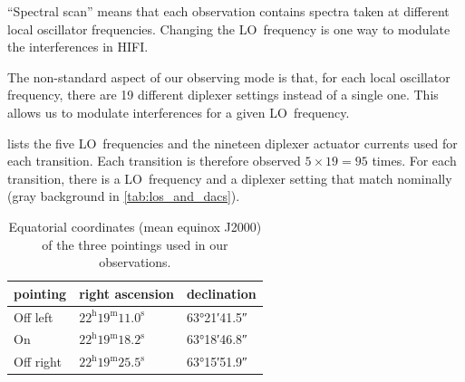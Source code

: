 ``Spectral scan'' means that each observation contains spectra taken at different local oscillator frequencies.
Changing the LO~frequency is one way to modulate the interferences in HIFI.

The non-standard aspect of our observing mode is that, for each local oscillator frequency, there are 19 different diplexer settings instead of a single one.
This allows us to modulate interferences for a given LO~frequency.

 lists the five LO~frequencies and the nineteen diplexer actuator currents used for each transition.
Each transition is therefore observed $5 \times 19 = 95$ times.
For each transition, there is a LO~frequency and a diplexer setting that match nominally (gray background in \cref{tab:los_and_dacs}).

\begin{table}[b]
%
    \centering
    \begin{tabular}{lll}
        \toprule
        pointing  & right ascension & declination \\
        \midrule
        Off left  & $22^\text{h}19^\text{m}11.0^\text{s}$ & \ang{63;21;41.5}\\
        On        & $22^\text{h}19^\text{m}18.2^\text{s}$ & \ang{63;18;46.8}\\
        Off right & $22^\text{h}19^\text{m}25.5^\text{s}$ & \ang{63;15;51.9}\\
        \bottomrule
    \end{tabular}
    \caption{Equatorial coordinates (mean equinox J2000) of the three pointings used in our observations.}
    \label{tab:on_off_positions}
\end{table}

